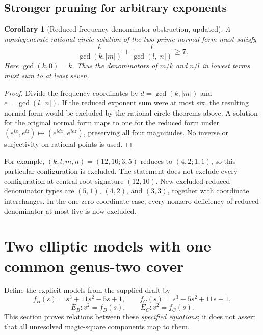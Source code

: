 \documentclass[11pt]{article}
\newtheorem{corollary}[theorem]{Corollary}
\theoremstyle{definition}\newtheorem{definition}[theorem]{Definition}
\theoremstyle{remark}\newtheorem{remark}[theorem]{Remark}
\begin{document}
\subsection{Stronger pruning for arbitrary exponents}
\begin{corollary}[Reduced-frequency denominator obstruction, updated]\label{cor:reduced}
A nondegenerate rational-circle solution of the two-prime normal form must satisfy
\begin{equation}\label{eq:gcdcriterion}
\boxed{\frac{k}{\gcd(k,|m|)}+\frac{l}{\gcd(l,|n|)}\ge7.}
\end{equation}
Here $\gcd(k,0)=k$. Thus the denominators of $m/k$ and $n/l$ in lowest terms must sum to at least seven.
\end{corollary}
\begin{proof}
Divide the frequency coordinates by $d=\gcd(k,|m|)$ and $e=\gcd(l,|n|)$. If the reduced exponent sum were at most six, the resulting normal form would be excluded by the rational-circle theorems above. A solution for the original normal form maps to one for the reduced form under $(e^{ix},e^{iz})\mapsto(e^{idx},e^{iez})$, preserving all four magnitudes. No inverse or surjectivity on rational points is used.
\end{proof}
For example, $(k,l;m,n)=(12,10;3,5)$ reduces to $(4,2;1,1)$, so this particular configuration is excluded. The statement does not exclude every configuration at central-root signature $(12,10)$. New excluded reduced-denominator types are $(5,1)$, $(4,2)$, and $(3,3)$, together with coordinate interchanges. In the one-zero-coordinate case, every nonzero deficiency of reduced denominator at most five is now excluded.

\section{Two elliptic models with one common genus-two cover}\label{sec:curves}
Define the explicit models from the supplied draft by
\[
f_B(s)=s^3+11s^2-5s+1,\qquad f_C(s)=s^3-5s^2+11s+1,
\]
\[
E_B:v^2=f_B(s),\qquad E_C:v^2=f_C(s).
\]
This section proves relations between these \emph{specified equations}; it does not assert that all unresolved magic-square components map to them.
\end{document}

